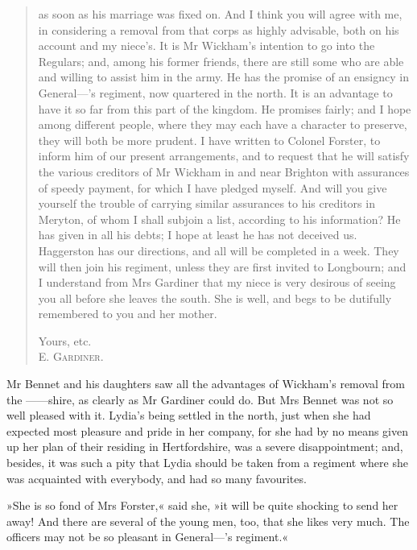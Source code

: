  
 \begin{quotation}
 \noindent as soon as his marriage was fixed on. And I think you will agree with me, in considering a removal from that corps as highly advisable, both on his account and my niece's. It is Mr Wickham's intention to go into the Regulars; and, among his former friends, there are still some who are able and willing to assist him in the army. He has the promise of an ensigncy in General—'s regiment, now quartered in the north. It is an advantage to have it so far from this part of the kingdom. He promises fairly; and I hope among different people, where they may each have a character to preserve, they will both be more prudent. I have written to Colonel Forster, to inform him of our present arrangements, and to request that he will satisfy the various creditors of Mr Wickham in and near Brighton with assurances of speedy payment, for which I have pledged myself. And will you give yourself the trouble of carrying similar assurances to his creditors in Meryton, of whom I shall subjoin a list, according to his information? He has given in all his debts; I hope at least he has not deceived us. Haggerston has our directions, and all will be completed in a week. They will then join his regiment, unless they are first invited to Longbourn; and I understand from Mrs Gardiner that my niece is very desirous of seeing you all before she leaves the south. She is well, and begs to be dutifully remembered to you and her mother.

\begin{flushright}
Yours, etc.\\
\textsc{E. Gardiner.}
\end{flushright}
\end{quotation}


Mr Bennet and his daughters saw all the advantages of Wickham's removal from the ——shire, as clearly as Mr Gardiner could do. But Mrs Bennet was not so well pleased with it. Lydia's being settled in the north, just when she had expected most pleasure and pride in her company, for she had by no means given up her plan of their residing in Hertfordshire, was a severe disappointment; and, besides, it was such a pity that Lydia should be taken from a regiment where she was acquainted with everybody, and had so many favourites.

»She is so fond of Mrs Forster,« said she, »it will be quite shocking to send her away! And there are several of the young men, too, that she likes very much. The officers may not be so pleasant in General—'s regiment.«

